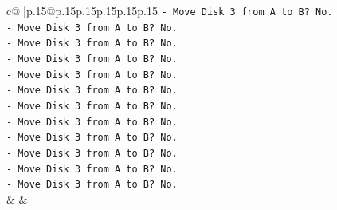 \documentclass{article}
\begin{document}
{\begin{supertabular}{c@{$\;$}|p{.15\linewidth}@{}p{.15\linewidth}p{.15\linewidth}p{.15\linewidth}p{.15\linewidth}p{.15\linewidth}}
{{{\texttt{{-} Move Disk 3 from A to B? No.} \\
\texttt{{-} Move Disk 3 from A to B? No.} \\
\texttt{{-} Move Disk 3 from A to B? No.} \\
\texttt{{-} Move Disk 3 from A to B? No.} \\
\texttt{{-} Move Disk 3 from A to B? No.} \\
\texttt{{-} Move Disk 3 from A to B? No.} \\
\texttt{{-} Move Disk 3 from A to B? No.} \\
\texttt{{-} Move Disk 3 from A to B? No.} \\
\texttt{{-} Move Disk 3 from A to B? No.} \\
\texttt{{-} Move Disk 3 from A to B? No.} \\
\texttt{{-} Move Disk 3 from A to B? No.} \\
\texttt{{-} Move Disk 3 from A to B? No.} \\
            }
        }
    }
    & & \\ \\


\end{supertabular}}
\end{document}
